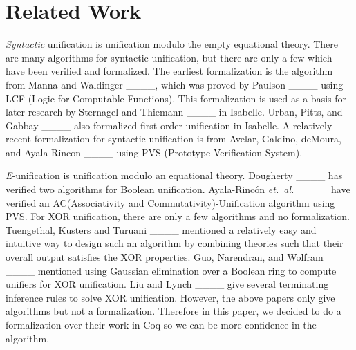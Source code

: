 \section{Related Work}
\emph{Syntactic} unification is unification modulo the empty
equational theory. There are many algorithms for syntactic unification, but there are
only a few which have been verified and formalized. The earliest formalization
is the algorithm from Manna and Waldinger ____, which was proved by Paulson ____ using LCF (Logic for Computable Functions). 
This formalization is used as a basis for later research by Sternagel and Thiemann 
____ in Isabelle. 
Urban, Pitts, and Gabbay ____ also formalized first-order unification in Isabelle. 
A relatively recent formalization for syntactic unification is from Avelar, Galdino, deMoura, and
Ayala-Rincon ____ using PVS (Prototype Verification System).

\emph{E}-unification is unification modulo an equational theory.
Dougherty ____ has verified two algorithms for Boolean 
unification.  Ayala-Rinc{\'o}n \emph{et.\ al.}\ ____ have
verified an AC(Associativity and Commutativity)-Unification algorithm using
PVS. For XOR unification, there are only a
few algorithms and no formalization. 
Tuengethal, Kusters and Turuani  ____
mentioned a relatively easy and intuitive way to design such an
algorithm by combining theories such that their overall output
satisfies the XOR properties. 
Guo, Narendran, and Wolfram ____ mentioned using Gaussian 
elimination over a Boolean ring to compute unifiers for XOR
unification. %
Liu and Lynch ____
give several terminating inference rules to solve XOR unification.  %
However, the above papers only give algorithms but not a formalization. Therefore 
in this paper, we decided to do a formalization over their work in Coq so we can be more confidence in the algorithm.